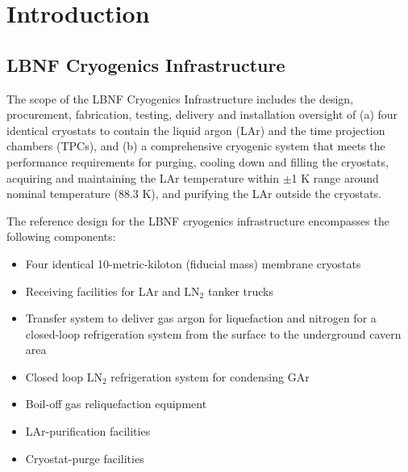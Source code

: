 \chapter{Introduction}
\label{ch:cryo-intro}

\section{LBNF Cryogenics Infrastructure}
\label{sec:cryo-intro-fd}

The scope of the LBNF Cryogenics Infrastructure includes the design, 
procurement, fabrication, testing, delivery and installation
oversight of (a) four identical cryostats to contain the liquid argon (LAr) 
and the time projection chambers (TPCs), and (b) a comprehensive 
cryogenic system that meets the performance requirements
for purging, cooling down and filling the cryostats, acquiring and 
maintaining the LAr temperature within $\pm$1 K range around nominal 
temperature (88.3 K), and purifying the LAr outside the cryostats.


The reference design for the LBNF cryogenics infrastructure 
encompasses the following components:

\begin{itemize}
\item Four identical 10-metric-kiloton (fiducial mass) membrane cryostats 
\item Receiving facilities for LAr and LN$_2$ tanker trucks 
\item Transfer system to deliver gas argon for liquefaction and 
      nitrogen for a closed-loop refrigeration system from the
      surface to the underground cavern area
\item Closed loop LN$_2$ refrigeration system for condensing GAr
\item Boil-off gas reliquefaction equipment
\item LAr-purification facilities
\item Cryostat-purge facilities
\end{itemize}


